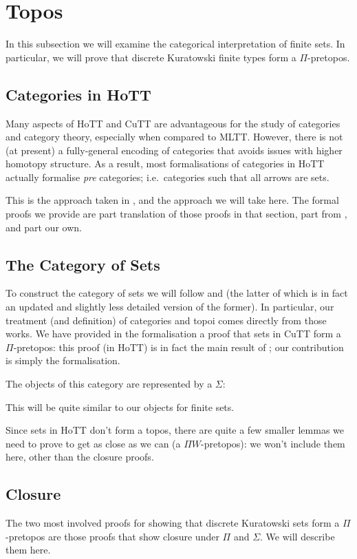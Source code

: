 \section{Topos}\label{topos}
In this subsection we will examine the categorical interpretation of finite
sets.
In particular, we will prove that discrete Kuratowski finite types form a
\(\Pi\)-pretopos.

\subsection{Categories in HoTT}
Many aspects of HoTT and CuTT are advantageous for the study of categories and
category theory, especially when compared to MLTT.
However, there is not (at present) a fully-general encoding of categories
that avoids issues with higher homotopy structure.
As a result, most formalisations of categories in HoTT actually formalise
\emph{pre} categories; i.e.\ categories such that all arrows are sets.

This is the approach taken in \citet[section 9]{hottbook}, and the approach we
will take here.
The formal proofs we provide are part translation of those proofs in that
section, part from \cite{iversenFredefoxCat2018}
\cite{huProofrelevantCategoryTheory2020}, and part our own.

\subsection{The Category of Sets}
To construct the category of sets we will follow
\citet{rijkeSetsHomotopyType2015} and
\citet[section 10]{hottbook} (the latter of which is in fact an updated and
slightly less detailed version of the former).
In particular, our treatment (and definition) of categories and topoi comes
directly from those works.
We have provided in the formalisation a proof that sets in CuTT form a
\(\Pi\)-pretopos: this proof (in HoTT) is in fact the main result of
\citet{rijkeSetsHomotopyType2015}; our contribution is simply the formalisation.

The objects of this category are represented by a \(\Sigma\):

This will be quite similar to our objects for finite sets.

Since sets in HoTT don't form a topos, there are quite a few smaller lemmas we
need to prove to get as close as we can (a \(\Pi W\)-pretopos): we won't include
them here, other than the closure proofs.
\subsection{Closure}
The two most involved proofs for showing that discrete Kuratowski sets form a
\(\Pi\)-pretopos are those proofs that show closure under \(\Pi\) and
\(\Sigma\).
We will describe them here.

